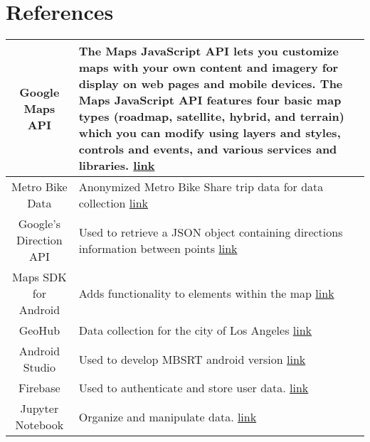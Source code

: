 \documentclass{article}
\begin{document}
\section{References}
\begin{tabular}{|c|p{10cm}|}
\hline
Google Maps API & The Maps JavaScript API lets you customize maps with your own content and imagery for display on web pages and mobile devices. The Maps JavaScript API features four basic map types (roadmap, satellite, hybrid, and terrain) which you can modify using layers and styles, controls and events, and various services and libraries. \href{https://developers.google.com/maps/documentation/javascript/tutorial}{link}\\
\hline
Metro Bike Data & Anonymized Metro Bike Share trip data for data collection \href{https://bikeshare.metro.net/about/data/} {link}\\
\hline
Google's Direction API & Used to retrieve a JSON object containing directions information between points \href{https://developers.google.com/maps/documentation/directions/start} {link}\\
\hline
Maps SDK for Android & Adds functionality to elements within the map \href{https://developers.google.com/maps/documentation/android-sdk/intro} {link}\\
\hline
GeoHub & Data collection for the city of Los Angeles \href{http://geohub.lacity.org/} {link}\\
\hline
Android Studio & Used to develop MBSRT android version \href{https://developer.android.com/docs} {link}\\
\hline
Firebase & Used to authenticate and store user data. \href{https://firebase.google.com/} {link}\\
\hline
Jupyter Notebook & Organize and manipulate data. \href{https://jupyter.org/} {link}\\
\hline

\end{tabular}
\end{document}
